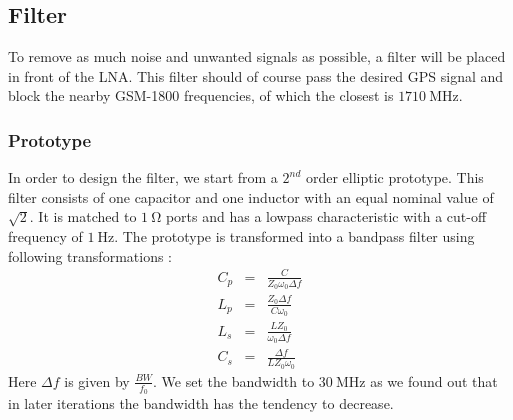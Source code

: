 \documentclass[a4paper]{article}        %
\begin{document}
		
	\subsection{Filter}
  To remove as much noise and unwanted signals as possible, a filter will be placed in front of the LNA. This filter should of course pass the desired GPS signal and block the nearby GSM-1800 frequencies, of which the closest is $\SI{1710}{\mega\hertz}$.
  \subsubsection{Prototype}
  In order to design the filter, we start from a $2^{nd}$ order elliptic prototype. This filter consists of one capacitor and one inductor with an equal nominal value of $\sqrt{2}$.  It is matched to $\SI{1}{\ohm}$ ports and has a lowpass characteristic with a cut-off frequency of $\SI{1}{\hertz}$.
  The prototype is transformed into a bandpass filter using following transformations \cite{coupled_lines}:
  \begin{eqnarray*}
    C_p &=& \frac{C}{Z_0 \omega_0 \Delta f}\\
    L_p &=& \frac{Z_0 \Delta f}{C \omega_0}\\
    L_s &=& \frac{L Z_0}{\omega_0 \Delta f}\\
    C_s &=& \frac{\Delta f}{L Z_0 \omega_0}
  \end{eqnarray*}
  Here $\Delta f$ is given by $\frac{BW}{f_0}$. We set the bandwidth to $\SI{30}{\mega\hertz}$ as we found out that in later iterations the bandwidth has the tendency to decrease.
\end{document}

